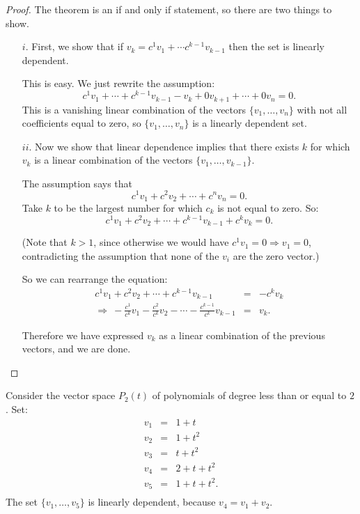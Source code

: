 \begin{proof}
The theorem is an if and only if statement, so there are two things to show.

\begin{itemize}
\item[$i.$]  First, we show that if $v_k=c^1v_1+\cdots c^{k-1}v_{k-1}$ then the set is linearly dependent.

This is easy.  We just rewrite the assumption:
\[
c^1v_1+\cdots+c^{k-1}v_{k-1}-v_k + 0v_{k+1}+\cdots +0v_n=0.
\]
This is a vanishing linear combination of the vectors $\{ v_1, \ldots, v_n \}$ with not all coefficients equal to zero, so $\{ v_1, \ldots, v_n \}$ is a linearly dependent set.
 
\item[$ii.$]  Now we show that linear dependence implies that there exists $k$ for which $v_k$ is a linear combination of the vectors $\{ v_1, \ldots, v_{k-1} \}$.

The assumption says that
\[
c^1v_1 + c^2v_2+ \cdots +c^nv_n=0.
\]
Take $k$ to be the largest number for which $c_k$ is not equal to zero.  So:
\[
c^1v_1 + c^2v_2+ \cdots +c^{k-1}v_{k-1}+c^kv_k=0.
\]

(Note that $k>1$, since otherwise we would have $c^1v_1=0\Rightarrow v_1=0$, contradicting the assumption that none of the $v_i$ are the zero vector.)

So we can rearrange the equation:
\begin{eqnarray*}
c^1v_1 + c^2v_2+ \cdots +c^{k-1}v_{k-1}&=&-c^kv_k\\ \Rightarrow\ 
-\frac{c^1}{c^k}v_1 - \frac{c^2}{c^k}v_2 - \cdots -\frac{c^{k-1}}{c^k}v_{k-1}&=&v_k.
\end{eqnarray*}

Therefore we have expressed $v_k$ as a linear combination of the previous vectors, and we are done.
\end{itemize}
\end{proof}


\begin{example}
Consider the vector space $P_2(t)$ of polynomials of degree less than or equal to $2$.  Set:
\begin{eqnarray*}
v_1 &=& 1+t \\
v_2 &=& 1+t^2 \\
v_3 &=& t+t^2 \\
v_4 &=& 2+t+t^2 \\
v_5 &=& 1+t+t^2. \\
\end{eqnarray*}
The set $\{ v_1, \ldots, v_5 \}$ is linearly dependent, because $v_4 = v_1+v_2$.  
\end{example}

